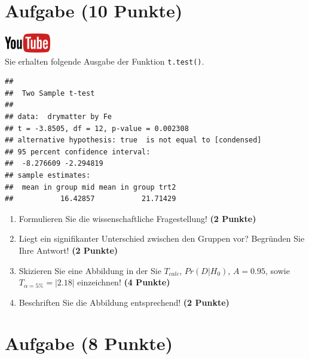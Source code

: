 \documentclass[a4paper, 9pt]{scrartcl}\usepackage[]{graphicx}\usepackage[]{xcolor}
\makeatletter
\newenvironment{kframe}{%
 \def\at@end@of@kframe{}%
 \ifinner\ifhmode%
  \def\at@end@of@kframe{\end{minipage}}%
  \begin{minipage}{\columnwidth}%
 \fi\fi%
 \def\FrameCommand##1{\hskip\@totalleftmargin \hskip-\fboxsep
 \colorbox{shadecolor}{##1}\hskip-\fboxsep
     \hskip-\linewidth \hskip-\@totalleftmargin \hskip\columnwidth}%
 \MakeFramed {\advance\hsize-\width
   \@totalleftmargin\z@ \linewidth\hsize
   \@setminipage}}%
 {\par\unskip\endMakeFramed%
 \at@end@of@kframe}
\newenvironment{knitrout}{}{} %
\makeatother
\begin{document}
\section{Aufgabe \hfill (10 Punkte)}

\hfill\href{https://youtu.be/exDo7AyHl4Q}{\includegraphics[width =
  2cm]{img/youtube}}\\[1Ex]

Sie erhalten folgende \Rlogo Ausgabe der Funktion \texttt{t.test()}.

\begin{knitrout}
\color{fgcolor}\begin{kframe}
\begin{verbatim}
## 
## 	Two Sample t-test
## 
## data:  drymatter by Fe
## t = -3.8505, df = 12, p-value = 0.002308
## alternative hypothesis: true  is not equal to [condensed]
## 95 percent confidence interval:
##  -8.276609 -2.294819
## sample estimates:
##  mean in group mid mean in group trt2 
##           16.42857           21.71429
\end{verbatim}
\end{kframe}
\end{knitrout}


\begin{enumerate}
  \item Formulieren Sie die wissenschaftliche Fragestellung! \textbf{(2
Punkte)}
\item Liegt ein signifikanter Unterschied zwischen den Gruppen vor?
  Begr{\"u}nden Sie Ihre Antwort! \textbf{(2 Punkte)}
\item Skizieren Sie eine Abbildung in der Sie $T_{calc}$, $Pr(D|H_0)$, $A=0.95$,
  sowie $T_{\alpha=5\%} = |2.18|$ einzeichnen! \textbf{(4 Punkte)}
\item Beschriften Sie die Abbildung entsprechend! \textbf{(2 Punkte)}  
\end{enumerate} 
\clearpage

\section{Aufgabe \hfill (8 Punkte)}
\end{document}
